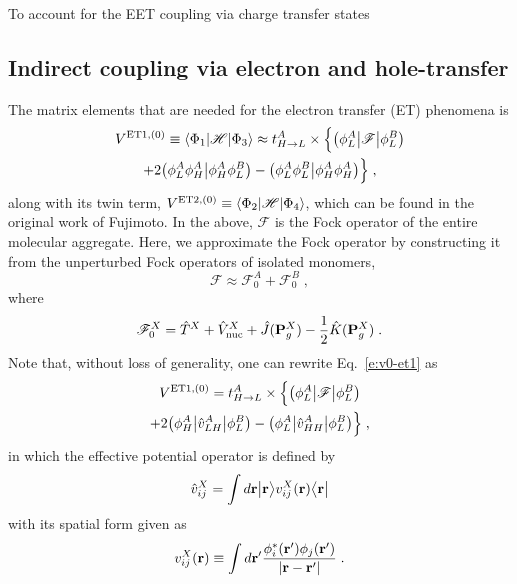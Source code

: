 To account for the EET coupling via charge transfer states 

\subsection{\label{s:2.1}Indirect coupling via electron and hole-transfer}

The matrix elements that are needed for the electron transfer (ET) phenomena
is
%
\begin{multline}\label{e:v0-et1}
 V^{{\rm ET1},(0)} \equiv \left< \Phi_1 \vert \mathscr{H} \vert \Phi_3 \right> \approx 
 t_{H\rightarrow L}^A \times \Big\{ 
 \big( \phi_L^A \big| \mathscr{F} \big| \phi_L^B \big) \\
   + 2 \big( \phi_L^A \phi_H^A \big| \phi_H^A \phi_L^B \big) - \big( \phi_L^A \phi_L^B \big| \phi_H^A \phi_H^A \big) 
 \Big\} \;,
\end{multline}
%
along with its twin term, $V^{{\rm ET2},(0)} \equiv \left< \Phi_2 \vert \mathscr{H} \vert \Phi_4 \right>$,
which can be found in the original work of Fujimoto.
In the above, $\mathscr{F}$ is the Fock operator of the entire molecular aggregate.
Here, we approximate the Fock operator by constructing it from the unperturbed
Fock operators of isolated monomers,
%
\begin{equation}
 \mathscr{F} \approx \mathscr{F}^{A}_0 + \mathscr{F}^{B}_0 \;,
\end{equation}
%
where
%
\begin{equation}
 \mathscr{F}^{X}_0 = \hat{T}^{X} + \hat{V}^{X}_{\rm nuc} + \hat{J}({\bf P}^{X}_g) - \frac{1}{2} \hat{K}({\bf P}^{X}_g) \;.
\end{equation}
%
Note that, without loss of generality, one can rewrite Eq.~\eqref{e:v0-et1}
as
%
\begin{multline}
 V^{{\rm ET1},(0)} = t_{H\rightarrow L}^A \times \Big\{ 
 \tbraket{\phi_L^A}{\mathscr{F}}{\phi_L^B} \\
  + 2 \tbraket{\phi_H^A}{\hat{v}_{LH}^A}{\phi_L^B}
  -   \tbraket{\phi_L^A}{\hat{v}_{HH}^A}{\phi_L^B}
 \Big\} \;,
\end{multline}
%
in which the effective potential operator\cite{Blasiak.Bednarska.Choluj.Bartkowiak.XXXX} is defined by
%
\begin{equation}
 \hat{v}_{ij}^X = \int d{\bf r} \Ket{{\bf r}} v_{ij}^X({\bf r})
 \Bra{{\bf r}}
\end{equation}
%
with its spatial form given as
%
\begin{equation}
 v_{ij}^X({\bf r}) \equiv \int d{\bf r}' \frac{\phi_i^*({\bf r}') \phi_j({\bf r}') }{\vert {\bf r} - {\bf r}'\vert} \;.
\end{equation}
